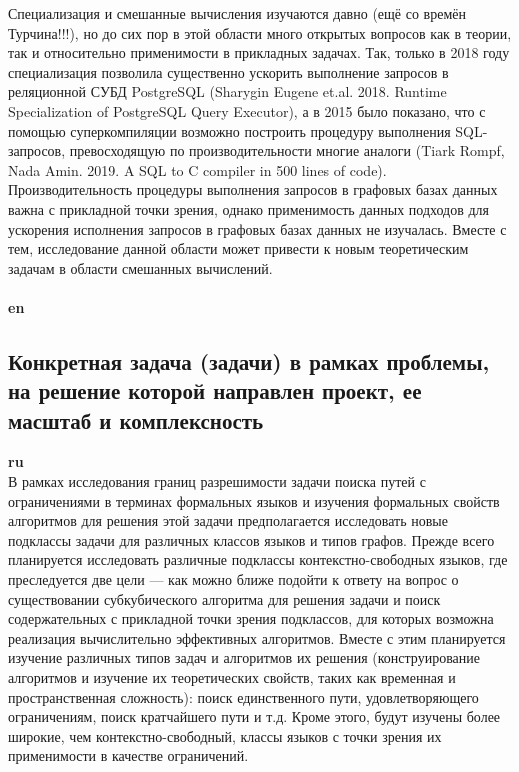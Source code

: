 \documentclass[12pt]{article}  %
\theoremstyle{remark}
\begin{document}
Специализация и смешанные вычисления изучаются давно (ещё со времён Турчина!!!), но до сих пор в этой области много открытых вопросов как в теории, так и относительно применимости в прикладных задачах.
Так, только в 2018 году специализация позволила существенно ускорить выполнение запросов в реляционной СУБД PostgreSQL (Sharygin Eugene et.al. 2018. Runtime Specialization of PostgreSQL Query Executor), а в 2015 было показано, что с помощью суперкомпиляции возможно построить процедуру выполнения SQL-запросов, превосходящую по производительности многие аналоги (Tiark Rompf, Nada Amin. 2019. A SQL to C compiler in 500 lines of code).
Производительность процедуры выполнения запросов в графовых базах данных важна с прикладной точки зрения, однако применимость данных подходов для ускорения исполнения запросов в графовых базах данных не изучалась.
Вместе с тем, исследование данной области может привести к новым теоретическим задачам в области смешанных вычислений.
\\
\\
\textbf{en}\\


\subsection{Конкретная задача (задачи) в рамках проблемы, на решение которой направлен проект, ее масштаб и комплексность}

\textbf{ru}\\
%
В рамках исследования границ разрешимости задачи поиска путей с ограничениями в терминах формальных языков и изучения формальных свойств алгоритмов для решения этой задачи предполагается исследовать новые подклассы задачи для различных классов языков и типов графов. Прежде всего планируется исследовать различные подклассы контекстно-свободных языков, где преследуется две цели --- как можно ближе подойти к ответу на вопрос о существовании субкубического алгоритма для решения задачи и поиск содержательных с прикладной точки зрения подклассов, для которых возможна реализация вычислительно эффективных алгоритмов. Вместе с этим планируется изучение различных типов задач и алгоритмов их решения (конструирование алгоритмов и изучение их теоретических свойств, таких как временная и пространственная сложность): поиск единственного пути, удовлетворяющего ограничениям, поиск кратчайшего пути и т.д. Кроме этого, будут изучены более широкие, чем контекстно-свободный, классы языков с точки зрения их применимости в качестве ограничений.
\end{document}
